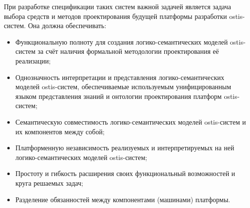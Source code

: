 При разработке спецификации таких систем важной задачей является задача выбора средств и методов проектирования
будущей платформы разработки ostis-систем. Она должна обеспечивать:

\begin{itemize}
    \item Функциональную полноту для создания логико-семантических моделей ostis-систем за счёт наличия формальной
    методологии проектирования её реализации;
    \item Однозначность интерпретации и представления логико-семантических моделей ostis-систем, обеспечиваемые
    используемым унифицированным языком представления знаний и онтологии проектирования платформ ostis-систем;
    \item Семантическую совместимость логико-семантических моделей ostis-систем и их компонентов между собой;
    \item Платформенную независимость реализуемых и интерпретируемых на ней логико-семантических моделей ostis-систем;
    \item Простоту и гибкость расширения своих функциональный возможностей и круга решаемых задач;
    \item Разделение обязанностей между компонентами (машинами) платформы.
\end{itemize}

